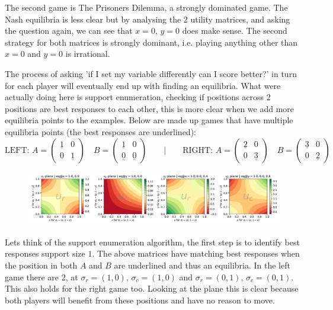 \documentclass[9pt]{report}
\begin{document}
    The second game is The Prisoners Dilemma, a strongly dominated game. The Nash equilibria is less clear but by analysing the 2 utility matrices, and asking the question again, we can see that $x=0$, $y=0$ does make sense. The second strategy for both matrices is strongly dominant, i.e. playing anything other than $x=0$ and $y=0$ is irrational. 
   
    The process of asking 'if I set my variable differently can I score better?' in turn for each player will eventually end up with finding an equilibria. What were actually doing here is support enumeration, checking if positions across 2 positions are best responses to each other, this is more clear when we add more equilibria points to the examples. Below are made up games that have multiple equilibria points (the best responses are underlined): 
    \begingroup\makeatletter\def\f@size{8}\check@mathfonts
        $$ \text{LEFT:  }
            A=\begin{pmatrix}\underline1 & 0 \\ 0 & \underline1\end{pmatrix}\quad
            B=\begin{pmatrix}\underline1 & 0 \\ \underline0 & \underline0\end{pmatrix}\qquad\vert\qquad
        \text{RIGHT: }
            A=\begin{pmatrix}\underline2 & 0 \\ 0 & \underline3\end{pmatrix}\quad
            B=\begin{pmatrix}\underline3 & 0 \\ 0 & \underline2\end{pmatrix}$$
    \endgroup
    \begin{figure}[ht]
        \includegraphics[width=1.0\textwidth, center]{./img/f2.pdf}
    \end{figure}

    Lets think of the support enumeration algorithm, the first step is to identify best responses support size $1$. The above matrices have matching best responses when the position in both $A$ and $B$ are underlined and thus an equilibria. In the left game there are 2, at $\sigma_r=(1,0),\, \sigma_c=(1,0)$ and $\sigma_r=(0,1),\, \sigma_c=(0,1)$. This also holds for the right game too. Looking at the plane this is clear because both players will benefit from these positions and have no reason to move.
\end{document}
